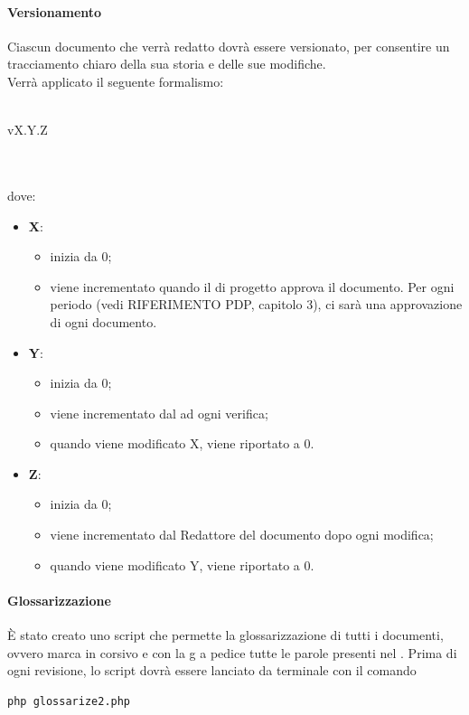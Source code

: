 \paragraph{Versionamento}
Ciascun documento che verrà redatto dovrà essere versionato, per consentire un tracciamento chiaro della sua storia e delle sue modifiche.\\Verrà applicato il seguente formalismo:\\ \\ \centerline{vX.Y.Z}\\ \\dove:
\begin{itemize}
	\item \textbf{X}:
	\begin{itemize}
		\item inizia da 0;
		\item viene incrementato quando il \RESP{} di progetto approva il documento. Per ogni periodo (vedi RIFERIMENTO PDP, capitolo 3), ci sarà una approvazione di ogni documento.
	\end{itemize}
	\item \textbf{Y}:
	\begin{itemize}
		\item inizia da 0;
		\item viene incrementato dal \VER{} ad ogni verifica;
		\item quando viene modificato X, viene riportato a 0.
	\end{itemize}
	\item \textbf{Z}:
	\begin{itemize}
		\item inizia da 0;
		\item viene incrementato dal Redattore del documento dopo ogni modifica;
		\item quando viene modificato Y, viene riportato a 0.
	\end{itemize}
\end{itemize}
\paragraph{Glossarizzazione}
È stato creato uno script  che permette la glossarizzazione di tutti i documenti, ovvero marca in corsivo e con la g a pedice tutte le parole presenti nel \Gldoc{}. Prima di ogni revisione, lo script dovrà essere lanciato da terminale con il comando \begin{verbatim}
php glossarize2.php
\end{verbatim}

